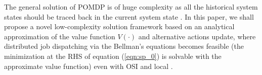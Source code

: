 The general solution of POMDP is of huge complexity {as all the historical system states should be traced back in the current system state} \cite{IJCAI03-NairR,IJCAI99-BoutilierC}.
In this paper, we shall propose a novel low-complexity solution framework based on an analytical approximation of the value function $V(\cdot)$ and alternative actions update, where distributed job dispatching via the Bellman's equations becomes feasible
(the minimization at the RHS of equation (\ref{eqn:sp_0}) is solvable with the approximate value function)
even with OSI and local \brlatency.
